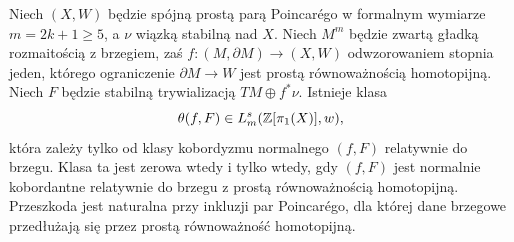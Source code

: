 \begin{twierdzenie}
\label{thm:wall-odd-22}
Niech $(X,W)$ będzie spójną prostą parą Poincarégo
w formalnym wymiarze $m=2k+1\geq5$, a $\nu$ wiązką
stabilną nad $X$. Niech $M^m$ będzie zwartą gładką
rozmaitością z brzegiem, zaś
$f:(M,\partial M)\to(X,W)$ odwzorowaniem stopnia
jeden, którego ograniczenie
$\partial M\to W$ jest prostą równoważnością
homotopijną. Niech $F$ będzie stabilną
trywializacją $TM\oplus f^*\nu$.
Istnieje klasa
\[
 \theta(f,F)\in L^s_m(\mathbb{Z}[\pi_1(X)],w),
\]
która zależy tylko od klasy kobordyzmu normalnego
$(f,F)$ relatywnie do brzegu. Klasa ta jest zerowa
wtedy i tylko wtedy, gdy $(f,F)$ jest normalnie
kobordantne relatywnie do brzegu z prostą
równoważnością homotopijną. Przeszkoda jest
naturalna przy inkluzji par Poincarégo, dla której
dane brzegowe przedłużają się przez prostą
równoważność homotopijną.
\end{twierdzenie}

